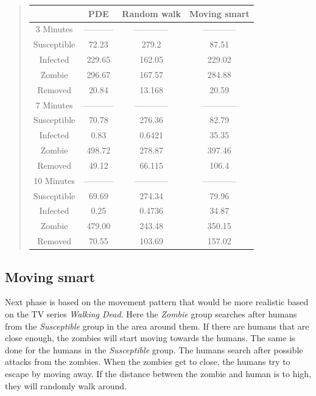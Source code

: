 \documentclass[%
twoside,                 %
final,                   %
chapterprefix=true,      %
open=right               %
10pt]{book}
\begin{document}
\begin{quote}
\begin{tabular}{cccc}
\hline
\multicolumn{1}{c}{  } & \multicolumn{1}{c}{ PDE } & \multicolumn{1}{c}{ Random walk } & \multicolumn{1}{c}{ Moving smart } \\
\hline
3 Minutes   & ----------- & ------------ & ------------ \\
\hline
Susceptible & 72.23       & 279.2        & 87.51        \\
Infected    & 229.65      & 162.05       & 229.02       \\
Zombie      & 296.67      & 167.57       & 284.88       \\
Removed     & 20.84       & 13.168       & 20.59        \\
\hline
7 Minutes   & ----------- & ------------ & ------------ \\
\hline
Susceptible & 70.78       & 276.36       & 82.79        \\
Infected    & 0.83        & 0.6421       & 35.35        \\
Zombie      & 498.72      & 278.87       & 397.46       \\
Removed     & 49.12       & 66.115       & 106.4        \\
\hline
10 Minutes  & ----------- & ------------ & ------------ \\
\hline
Susceptible & 69.69       & 274.34       & 79.96        \\
Infected    & 0.25        & 0.4736       & 34.87        \\
Zombie      & 479.00      & 243.48       & 350.15       \\
Removed     & 70.55       & 103.69       & 157.02       \\
\hline
\end{tabular}
\end{quote}

\noindent



\subsection{Moving smart}
Next phase is based on the movement pattern that would be more realistic based on the TV series \emph{Walking Dead}. Here the \emph{Zombie} group searches after humans from the \emph{Susceptible} group in the area around them. If there are humans that are close enough, the zombies will start moving towards the humans. The same is done for the humans in the \emph{Susceptible} group. The humans search after possible attacks from the zombies. When the zombies get to close, the humans try to escape by moving away. If the distance between the zombie and human is to high, they will randomly walk around. 
\end{document}
